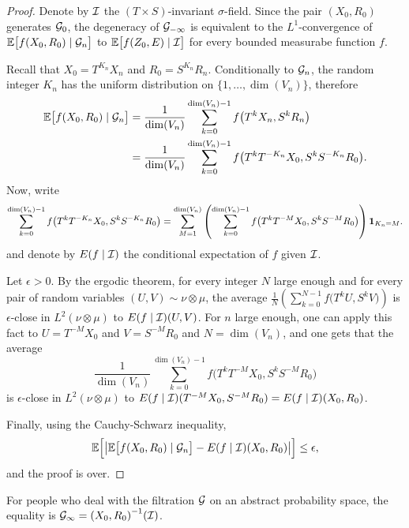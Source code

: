 \documentclass[12pt,a4paper]{article}
\begin{document}
\begin{proof}
Denote by $\mathcal{I}$ the $(T\times S)$-invariant $\sigma$-field. 
Since the pair $(X_0, R_0)$ generates $\mathcal{G}_0$, the degeneracy of $\mathcal{G}_{-\infty}$ 
is equivalent to the $L^1$-convergence of 
$\mathbb{E}\bigl[f(X_0, R_0) \mid \mathcal{G}_n\bigr]$ to $\mathbb{E}\bigl[f(Z_0, E) \mid \mathcal{I}\bigr]$   
for every bounded measurabe function $f$. 

Recall that $X_{0} = T^{K_n}X_n$ and $R_{0} = S^{K_n}R_n$. 
Conditionally to $\mathcal{G}_n$, the random integer $K_n$ 
has the uniform distribution on $\bigl\{1, \ldots, \dim(V_n)\bigr\}$, 
therefore 
\begin{align*}
\mathbb{E}\bigl[f(X_0, R_0) \mid \mathcal{G}_n\bigr]
& =\frac{1}{\dim(V_n)}\sum_{k=0}^{\dim(V_n)-1} f\bigl(T^kX_n, S^kR_n \bigr) \\
& = \frac{1}{\dim(V_n)}\sum_{k=0}^{\dim(V_n)-1} f\bigl(T^{k}T^{-K_n}X_0, S^{k}S^{-K_n}R_0 \bigr).
\end{align*}
Now, write 
$$
\sum_{k=0}^{\dim(V_n)-1} f\bigl(T^{k}T^{-K_n}X_0, S^{k}S^{-K_n}R_0 \bigr) = 
\sum_{M=1}^{\dim(V_n)} \left(\sum_{k=0}^{\dim(V_n)-1} f\bigl(T^kT^{-M}X_0, S^kS^{-M}R_0 \bigr) \right)\boldsymbol 1_{K_n=M}.
$$
and denote by $E(f\mid\mathcal{I})$ the conditional expectation of $f$ given $\mathcal{I}$.

Let $\epsilon>0$. By the ergodic theorem, for every integer $N$ large enough and 
for every pair of random variables $(U,V) \sim \nu \otimes \mu$, the average 
$\frac{1}{N} \left(\sum_{k=0}^{N-1} f\bigl(T^k U, S^kV\bigr) \right)$ 
is $\epsilon$-close in $L^2(\nu \otimes \mu)$ to 
$E(f\mid\mathcal{I})(U,V)$. 
For $n$ large enough, one can apply this fact to $U=T^{-M}X_0$ and $V=S^{-M}R_0$ and 
$N=\dim(V_n)$, and one gets that the average 
$$
\frac{1}{\dim(V_n)}\sum_{k=0}^{\dim(V_n)-1} f\bigl(T^kT^{-M}X_0, S^kS^{-M}R_0 \bigr)
$$
is $\epsilon$-close in $L^2(\nu \otimes \mu)$ to 
$E(f\mid\mathcal{I})(T^{-M}X_0,S^{-M}R_0)=E(f\mid\mathcal{I})(X_0,R_0)$. 

Finally, using the Cauchy-Schwarz inequality,
$$
\mathbb{E}\Bigl[ \left| \mathbb{E}\bigl[f(X_0, R_0) \mid \mathcal{G}_n\bigr] - E(f\mid\mathcal{I})(X_0,R_0) \right| \Bigr] 
\leq \epsilon,
$$
and the proof is over.
\end{proof}

\begin{remark}
For people who deal with the filtration $\mathcal{G}$ on an abstract probability space, 
the equality is $\mathcal{G}_\infty = {(X_0, R_0)}^{-1}(\mathcal{I})$. 
\end{remark}

\end{document}
